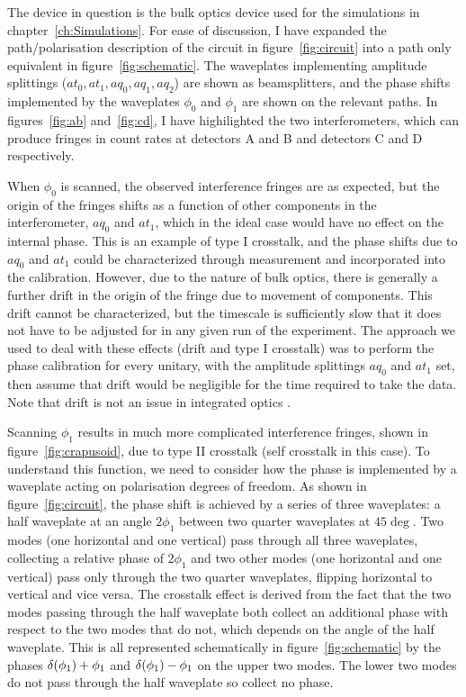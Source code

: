 The device in question is the bulk optics device used for the simulations in
chapter~\ref{ch:Simulations}. For ease of discussion, I have expanded the
path/polarisation description of the circuit in figure~\ref{fig:circuit} into a
path only equivalent in figure~\ref{fig:schematic}. The waveplates implementing
amplitude splittings (\(at_{0}, at_{1}, aq_{0}, aq_{1}, aq_{2}\)) are shown as
beamsplitters, and the phase shifts implemented by the waveplates \(\phi_{0}\)
and \(\phi_{1}\) are shown on the relevant paths. In figures~\ref{fig:ab}
and~\ref{fig:cd}, I have highilighted the two interferometers, which can produce
fringes in count rates at detectors A and B and detectors C and D respectively.

When \(\phi_{0}\) is scanned, the observed interference fringes are as expected,
but the origin of the fringes shifts as a function of other components in the
interferometer, \(aq_{0}\) and \(at_{1}\), which in the ideal case would have no
effect on the internal phase. This is an example of type I crosstalk, and the
phase shifts due to \(aq_{0}\) and \(at_{1}\) could be characterized through
measurement and incorporated into the calibration. However, due to the nature of
bulk optics, there is generally a further drift in the origin of the fringe due
to movement of components. This drift cannot be characterized, but the timescale
is sufficiently slow that it does not have to be adjusted for in any given run
of the experiment. The approach we used to deal with these effects (drift and
type I crosstalk) was to perform the phase calibration for every unitary, with
the amplitude splittings \(aq_{0}\) and \(at_{1}\) set, then assume that drift
would be negligible for the time required to take the data. Note that drift is
not an issue in integrated optics \cite{politi-ic}.

Scanning \(\phi_{1}\) results in much more complicated interference fringes,
shown in figure~\ref{fig:crapusoid}, due to type II crosstalk (self crosstalk in
this case). To understand this function, we need to consider how the phase is
implemented by a waveplate acting on polarisation degrees of freedom. As shown
in figure~\ref{fig:circuit}, the phase shift is achieved by a series of three
waveplates: a half waveplate at an angle \(2\phi_{1}\) between two quarter
waveplates at \(45\deg\). Two modes (one horizontal and one vertical) pass
through all three waveplates, collecting a relative phase of \(2\phi_{1}\) and
two other modes (one horizontal and one vertical) pass only through the two
quarter waveplates, flipping horizontal to vertical and vice versa. The
crosstalk effect is derived from the fact that the two modes passing through the
half waveplate both collect an additional phase with respect to the two modes
that do not, which depends on the angle of the half waveplate. This is all
represented schematically in figure~\ref{fig:schematic} by the phases \(\delta
\!\left(\phi_{1}\right) + \phi_{1}\) and \(\delta \!\left(\phi_{1}\right) - \phi_{1}\) on the upper
two modes. The lower two modes do not pass through the half waveplate so collect
no phase.

